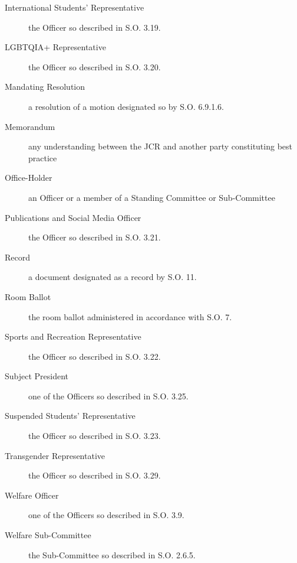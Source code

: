 \begin{description}
\item[International Students' Representative] the Officer so described in S.O. 3.19.
\item[LGBTQIA+ Representative] the Officer so described in S.O. 3.20.
\item[Mandating Resolution] a resolution of a motion designated so by S.O. 6.9.1.6.
\item[Memorandum] any understanding between the JCR and another party constituting best practice 
\item[Office-Holder] an Officer or a member of a Standing Committee or Sub-Committee
\item[Publications and Social Media Officer] the Officer so described in S.O. 3.21.
\item[Record] a document designated as a record by S.O. 11.
\item[Room Ballot] the room ballot administered in accordance with S.O. 7.
\item[Sports and Recreation Representative] the Officer so described in S.O. 3.22.
\item[Subject President] one of the Officers so described in S.O. 3.25.
\item[Suspended Students’ Representative] the Officer so described in S.O. 3.23.
\item[Transgender Representative] the Officer so described in S.O. 3.29. 
\item[Welfare Officer] one of the Officers so described in S.O. 3.9.
\item[Welfare Sub-Committee] the Sub-Committee so described in S.O. 2.6.5.
\end{description}